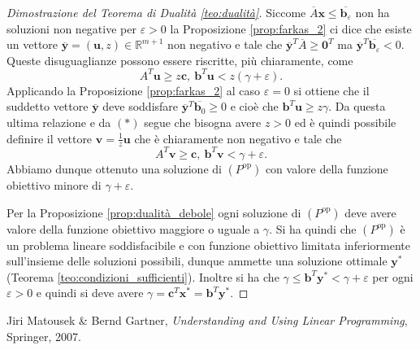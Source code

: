 \documentclass[italian, 12pt, reqno]{article}
\theoremstyle{myteo}
\numberwithin{equation}{section}
\newcommand{\dual}[1]{#1^{\text{op}}}
\begin{document}
\begin{proof}[Dimostrazione del Teorema di Dualità \ref{teo:dualità}]
  Siccome \(\overline{A}\textbf{x} \leq \overline{\textbf{b}_\varepsilon}\) non ha soluzioni non negative per \(\varepsilon>0\) la Proposizione \ref{prop:farkas_2} ci dice che esiste un vettore \(\overline{\textbf{y}}=(\textbf{u}, z)\in \mathbb{R}^{m+1}\) non negativo e tale che \(\overline{\textbf{y}}^T\overline{A} \geq \textbf{0}^T\) ma \(\overline{\textbf{y}}^T\overline{\textbf{b}_\varepsilon} < 0\).
  Queste disuguaglianze possono essere riscritte, più chiaramente, come
  \begin{equation*}
    \tag{\(*\)}
    A^T \textbf{u} \geq z \textbf{c},\ \textbf{b}^T \textbf{u} < z(\gamma + \varepsilon).
  \end{equation*}
  Applicando la Proposizione \ref{prop:farkas_2} al caso \(\varepsilon=0\) si ottiene che il suddetto vettore \(\overline{\textbf{y}}\) deve soddisfare \(\overline{\textbf{y}}^T \overline{\textbf{b}_0} \geq 0\) e cioè che \(\textbf{b}^T \textbf{u} \ge z\gamma\).
  Da questa ultima relazione e da \((*)\) segue che bisogna avere \(z>0\) ed è quindi possibile definire il vettore \(\textbf{v} = \frac{1}{z}\textbf{u}\) che è chiaramente non negativo e tale che
  \begin{equation*}
    A^T \textbf{v} \geq \textbf{c},\ \textbf{b}^T \textbf{v} < \gamma + \varepsilon.
  \end{equation*}
  Abbiamo dunque ottenuto una soluzione di \((\dual{P})\) con valore della funzione obiettivo minore di \(\gamma + \varepsilon\).

  Per la Proposizione \ref{prop:dualità_debole} ogni soluzione di \((\dual{P})\) deve avere valore della funzione obiettivo maggiore o uguale a \(\gamma\).
  Si ha quindi che \((\dual{P})\) è un problema lineare soddisfacibile e con funzione obiettivo limitata inferiormente sull'insieme delle soluzioni possibili, dunque ammette una soluzione ottimale \(\textbf{y}^*\) (Teorema \ref{teo:condizioni_sufficienti}).
  Inoltre si ha che \(\gamma \le \textbf{b}^T\textbf{y}^* < \gamma + \varepsilon\) per ogni \(\varepsilon>0\) e quindi si deve avere \(\gamma = \textbf{c}^T \textbf{x}^* = \textbf{b}^T\textbf{y}^*\).
\end{proof}

\begin{thebibliography}{1}
  Jiri Matousek \& Bernd Gartner,
  \textit{Understanding and Using Linear Programming},
  Springer,
  2007.
\end{thebibliography}
\end{document}
